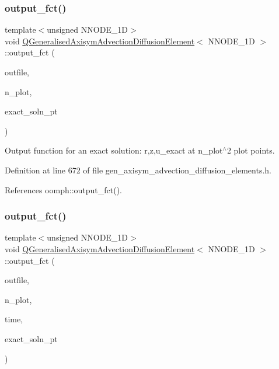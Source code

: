 \subsubsection{\texorpdfstring{output\+\_\+fct()}{output\_fct()}\hspace{0.1cm}{\footnotesize\ttfamily [1/2]}}
{\footnotesize\ttfamily template$<$unsigned N\+N\+O\+D\+E\+\_\+1D$>$ \\
void \hyperlink{classQGeneralisedAxisymAdvectionDiffusionElement}{Q\+Generalised\+Axisym\+Advection\+Diffusion\+Element}$<$ N\+N\+O\+D\+E\+\_\+1D $>$\+::output\+\_\+fct (\begin{DoxyParamCaption}\item[{std\+::ostream \&}]{outfile,  }\item[{const unsigned \&}]{n\+\_\+plot,  }\item[{Finite\+Element\+::\+Steady\+Exact\+Solution\+Fct\+Pt}]{exact\+\_\+soln\+\_\+pt }\end{DoxyParamCaption})\hspace{0.3cm}{\ttfamily [inline]}}



Output function for an exact solution\+: r,z,u\+\_\+exact at n\+\_\+plot$^\wedge$2 plot points. 



Definition at line 672 of file gen\+\_\+axisym\+\_\+advection\+\_\+diffusion\+\_\+elements.\+h.



References oomph\+::output\+\_\+fct().

\mbox{\label{classQGeneralisedAxisymAdvectionDiffusionElement_a1f731cce10286e25c409d13bf3354da1}} 
\subsubsection{\texorpdfstring{output\+\_\+fct()}{output\_fct()}\hspace{0.1cm}{\footnotesize\ttfamily [2/2]}}
{\footnotesize\ttfamily template$<$unsigned N\+N\+O\+D\+E\+\_\+1D$>$ \\
void \hyperlink{classQGeneralisedAxisymAdvectionDiffusionElement}{Q\+Generalised\+Axisym\+Advection\+Diffusion\+Element}$<$ N\+N\+O\+D\+E\+\_\+1D $>$\+::output\+\_\+fct (\begin{DoxyParamCaption}\item[{std\+::ostream \&}]{outfile,  }\item[{const unsigned \&}]{n\+\_\+plot,  }\item[{const double \&}]{time,  }\item[{Finite\+Element\+::\+Unsteady\+Exact\+Solution\+Fct\+Pt}]{exact\+\_\+soln\+\_\+pt }\end{DoxyParamCaption})\hspace{0.3cm}{\ttfamily [inline]}}



